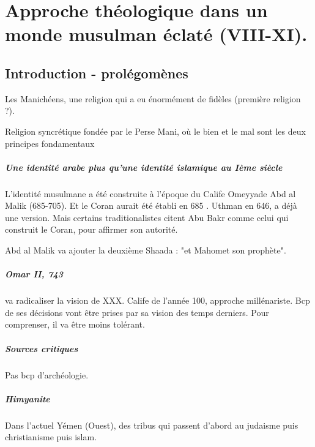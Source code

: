 \chapter{Approche théologique dans un monde musulman éclaté (VIII-XI).}


\section{Introduction - prolégomènes}
Les Manichéens, une religion qui a eu énormément de fidèles (première religion ?).
\begin{Def}[manichéisme]
Religion syncrétique fondée par le Perse Mani, où le bien et le mal sont les deux principes fondamentaux
\end{Def}

\paragraph{Une identité arabe plus qu'une identité islamique au Ième siècle} L'identité musulmane a été construite à l'époque du Calife Omeyyade Abd al Malik (685-705). Et le Coran aurait été établi en 685 . Uthman en 646, a déjà une version. Mais certains traditionalistes citent Abu Bakr comme celui qui construit le Coran, pour affirmer son autorité.

Abd al Malik va ajouter la deuxième Shaada : "et Mahomet son prophète". 

\paragraph{Omar II, 743} va radicaliser la vision de XXX. Calife de l'année 100, approche millénariste.
Bcp de ses décisions vont être prises par sa vision des temps derniers. Pour comprenser, il va être moins tolérant.

\paragraph{Sources critiques} Pas bcp d'archéologie. 

\paragraph{Himyanite} Dans l'actuel Yémen (Ouest), des tribus qui passent d'abord au judaisme puis christianisme  puis islam. 



